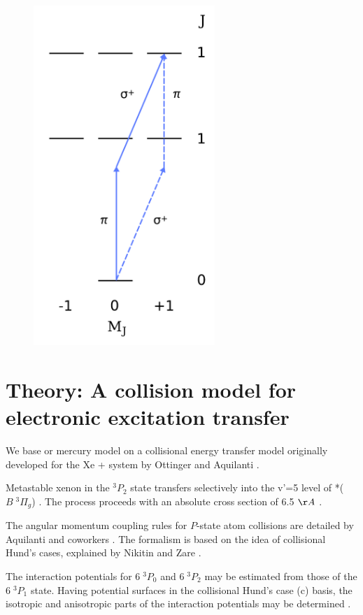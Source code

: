 \documentclass[12pt]{mitthesis}
\begin{document}
\begin{figure}
  \includegraphics[width=2.7in]{hg-forbidden-perppol.pdf}
\end{figure}

\section{Theory: A collision model for electronic excitation transfer}

We base or mercury model on a collisional energy transfer model
originally developed for the Xe +  system by Ottinger and
Aquilanti \cite{aquilanti90, aquilanti94}.

Metastable xenon in the $^3P_2$ state transfers selectively into the
v'=5 level of *($B\; ^3\Pi_g$) \cite{krumpelmann87,
  krumpelmann88, ottinger95b, aardema94}.  The process proceeds with
an absolute cross section of 6.5 $\AA$ \cite{bohle89}.

The angular momentum coupling rules for $P$-state atom collisions are
detailed by Aquilanti and coworkers \cite{aquilanti80a, aquilanti80b}.
The formalism is based on the idea of collisional Hund's cases,
explained by Nikitin and Zare \cite{nikitin94}.

The interaction potentials for $6 \; ^3P_0$ and $6 \; ^3P_2$ may be
estimated from those of the $6 \; ^3P_1$ state.  Having potential
surfaces in the collisional Hund's case (c) basis, the isotropic and
anisotropic parts of the interaction potentials may be determined
\cite{aquilanti89}.
\end{document}
